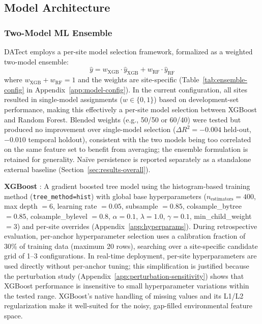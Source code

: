 \documentclass[toxins,article,submit,moreauthors]{Definitions/mdpi}
\begin{document}
\subsection{Model Architecture}
\label{sec:model-selection}

\subsubsection{Two-Model ML Ensemble}

DATect employs a per-site model selection framework, formalized as a weighted two-model ensemble:
\begin{equation}
\hat{y} = w_{\text{XGB}} \cdot \hat{y}_{\text{XGB}} + w_{\text{RF}} \cdot \hat{y}_{\text{RF}}
\label{eq:ensemble}
\end{equation}
where $w_{\text{XGB}} + w_{\text{RF}} = 1$ and the weights are site-specific (Table~\ref{tab:ensemble-config} in Appendix~\ref{app:model-config}). In the current configuration, all sites resulted in single-model assignments ($w \in \{0, 1\}$) based on development-set performance, making this effectively a per-site model selection between XGBoost and Random Forest. Blended weights (e.g., 50/50 or 60/40) were tested but produced no improvement over single-model selection ($\Delta R^2 = -0.004$ held-out, $-0.010$ temporal holdout), consistent with the two models being too correlated on the same feature set to benefit from averaging; the ensemble formulation is retained for generality. Na\"ive persistence is reported separately as a standalone external baseline (Section~\ref{sec:results-overall}).

\textbf{XGBoost} \cite{Chen2016}: A gradient boosted tree model using the histogram-based training method (\texttt{tree\_method=hist}) with global base hyperparameters ($n_{\text{estimators}} = 400$, max depth $= 6$, learning rate $= 0.05$, subsample $= 0.85$, colsample\_bytree $= 0.85$, colsample\_bylevel $= 0.8$, $\alpha = 0.1$, $\lambda = 1.0$, $\gamma = 0.1$, min\_child\_weight $= 3$) and per-site overrides (Appendix~\ref{app:hyperparams}). During retrospective evaluation, per-anchor hyperparameter selection uses a calibration fraction of 30\% of training data (maximum 20 rows), searching over a site-specific candidate grid of 1--3 configurations. In real-time deployment, per-site hyperparameters are used directly without per-anchor tuning; this simplification is justified because the perturbation study (Appendix~\ref{app:perturbation-sensitivity}) shows that XGBoost performance is insensitive to small hyperparameter variations within the tested range. XGBoost's native handling of missing values and its L1/L2 regularization make it well-suited for the noisy, gap-filled environmental feature space.
\end{document}

